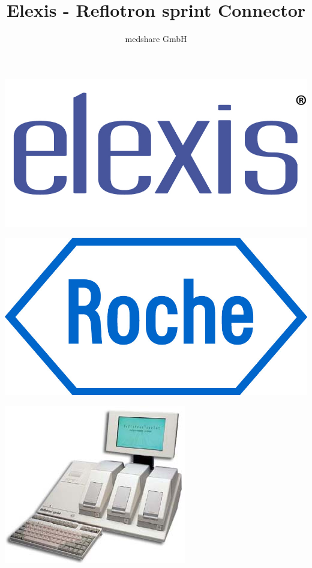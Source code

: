 \documentclass[a4paper]{scrartcl}
\title{Elexis - Reflotron sprint Connector}
\author{medshare GmbH}
\begin{document}
\maketitle
	\begin{center}
		\includegraphics{elexis_logo}
	\end{center}
	\begin{center}
		\includegraphics{roche_logo}
	\end{center}
	\begin{center}
		\includegraphics{reflotron_device}
	\end{center}
\pagebreak
\end{document}

